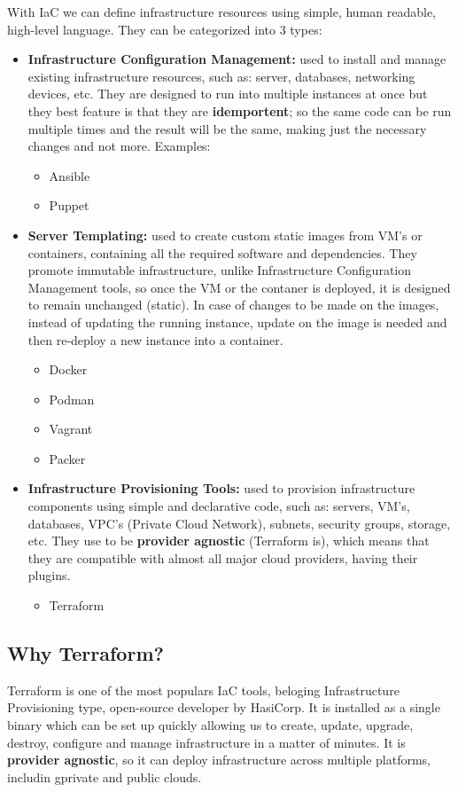 \documentclass{article}
\begin{document}
With IaC we can define infrastructure resources using simple, human readable, high-level language. They can be categorized into 3 types:

\begin{itemize}
    \item \textbf{Infrastructure Configuration Management:} used to install and manage existing infrastructure resources, such as: server, databases, networking devices, etc. They are designed to run into multiple instances at once but they best feature is that they are \textbf{idemportent}; so the same code can be run multiple times and the result will be the same, making just the necessary changes and not more. Examples:
    \begin{itemize}
        \item Ansible
        \item Puppet
    \end{itemize}
    \item \textbf{Server Templating:} used to create custom static images from VM's or containers, containing all the required software and dependencies. They promote immutable infrastructure, unlike Infrastructure Configuration Management tools, so once the VM or the contaner is deployed, it is designed to remain unchanged (static). In case of changes to be made on the images, instead of updating the running instance, update on the image is needed and then re-deploy a new instance into a container.
    \begin{itemize}
        \item Docker
        \item Podman
        \item Vagrant
        \item Packer
    \end{itemize}
    \item \textbf{Infrastructure Provisioning Tools:} used to provision infrastructure components using simple and declarative code, such as: servers, VM's, databases, VPC's (Private Cloud Network), subnets, security groups, storage, etc. They use to be \textbf{provider agnostic} (Terraform is), which means that they are compatible with almost all major cloud providers, having their plugins.
    \begin{itemize}
        \item Terraform
    \end{itemize}
\end{itemize}

\subsection{Why Terraform?}
Terraform is one of the most populars IaC tools, beloging Infrastructure Provisioning type, open-source developer by HasiCorp. It is installed as a single binary which can be set up quickly allowing us to create, update, upgrade, destroy, configure and manage infrastructure in a matter of minutes. It is \textbf{provider agnostic}, so it can deploy infrastructure across multiple platforms, includin gprivate and public clouds.
\end{document}
